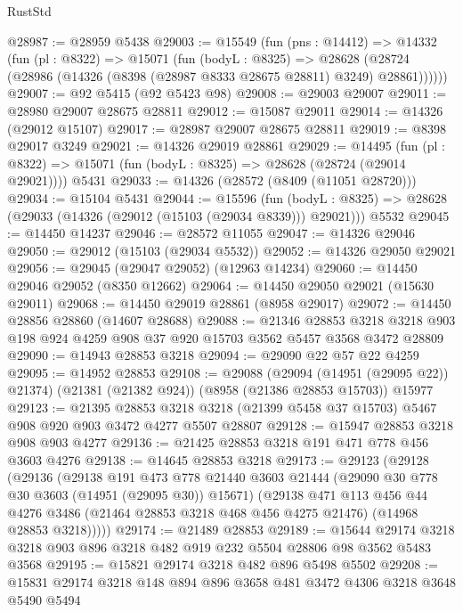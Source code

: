 \begin{lexlean}{RustStd}
\begin{coremodule}
@28987 := @28959 @5438
@29003 := @15549
    (fun (pns : @14412) =>
    @14332
      (fun (pl : @8322) =>
      @15071
        (fun (bodyL : @8325) =>
        @28628 (@28724 (@28986 (@14326 (@8398 (@28987 @8333 @28675 @28811) @3249) @28861))))))
@29007 := @92 @5415 (@92 @5423 @98)
@29008 := @29003 @29007
@29011 := @28980 @29007 @28675 @28811
@29012 := @15087 @29011
@29014 := @14326 (@29012 @15107)
@29017 := @28987 @29007 @28675 @28811
@29019 := @8398 @29017 @3249
@29021 := @14326 @29019 @28861
@29029 := @14495
    (fun (pl : @8322) => @15071 (fun (bodyL : @8325) => @28628 (@28724 (@29014 @29021))))
    @5431
@29033 := @14326 (@28572 (@8409 (@11051 @28720)))
@29034 := @15104 @5431
@29044 := @15596
    (fun (bodyL : @8325) => @28628 (@29033 (@14326 (@29012 (@15103 (@29034 @8339))) @29021)))
    @5532
@29045 := @14450 @14237
@29046 := @28572 @11055
@29047 := @14326 @29046
@29050 := @29012 (@15103 (@29034 @5532))
@29052 := @14326 @29050 @29021
@29056 := @29045 (@29047 @29052) (@12963 @14234)
@29060 := @14450 @29046 @29052 (@8350 @12662)
@29064 := @14450 @29050 @29021 (@15630 @29011)
@29068 := @14450 @29019 @28861 (@8958 @29017)
@29072 := @14450 @28856 @28860 (@14607 @28688)
@29088 := @21346
    @28853
    @3218
    @3218
    @903
    @198
    @924
    @4259
    @908
    @37
    @920
    @15703
    @3562
    @5457
    @3568
    @3472
    @28809
@29090 := @14943 @28853 @3218
@29094 := @29090 @22 @57 @22 @4259
@29095 := @14952 @28853
@29108 := @29088
    (@29094 (@14951 (@29095 @22)) @21374)
    (@21381 (@21382 @924))
    (@8958 (@21386 @28853 @15703))
    @15977
@29123 := @21395
    @28853
    @3218
    @3218
    (@21399 @5458 @37 @15703)
    @5467
    @908
    @920
    @903
    @3472
    @4277
    @5507
    @28807
@29128 := @15947 @28853 @3218 @908 @903 @4277
@29136 := @21425 @28853 @3218 @191 @471 @778 @456 @3603 @4276
@29138 := @14645 @28853 @3218
@29173 := @29123
    (@29128
      (@29136
        (@29138
          @191
          @473
          @778
          @21440
          @3603
          @21444
          (@29090 @30 @778 @30 @3603 (@14951 (@29095 @30)) @15671)
          (@29138
            @471
            @113
            @456
            @44
            @4276
            @3486
            (@21464 @28853 @3218 @468 @456 @4275 @21476)
            (@14968 @28853 @3218)))))
@29174 := @21489 @28853
@29189 := @15644
    @29174
    @3218
    @3218
    @903
    @896
    @3218
    @482
    @919
    @232
    @5504
    @28806
    @98
    @3562
    @5483
    @3568
@29195 := @15821 @29174 @3218 @482 @896 @5498 @5502
@29208 := @15831 @29174 @3218 @148 @894 @896 @3658 @481 @3472 @4306 @3218 @3648 @5490 @5494

\end{coremodule}
\end{lexlean}
